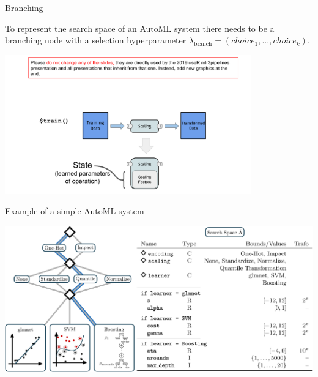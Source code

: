 \begin{frame}{Branching}

	To represent the search space of an AutoML system there needs to be a branching node with a selection hyperparameter $\lambda_\text{branch} = (choice_1, ..., choice_k)$.

	\begin{center}
		\includegraphics[page=22, width=0.8\textwidth, trim=40 120 120 80, clip]{images/mlr3Pipelines_graphics}
	\end{center}

\end{frame}



	
	\begin{frame}{Example of a simple AutoML system}
	
		\begin{center}
			\includegraphics[width = \textwidth]{images/pipeline_with_param_table.eps}
		\end{center}

	\end{frame}
	
